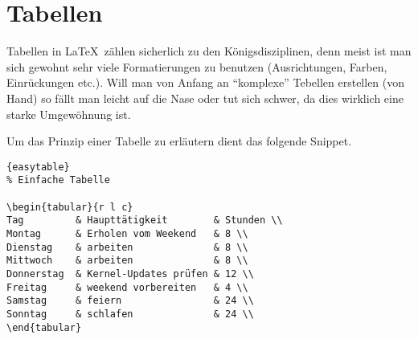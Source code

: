 \section{Tabellen}

\indent
Tabellen in \LaTeX~zählen sicherlich zu den
Königsdisziplinen, denn meist ist man sich gewohnt sehr
viele Formatierungen zu benutzen (Ausrichtungen, Farben,
Einrückungen etc.). Will man von Anfang an ``komplexe''
Tebellen erstellen (von Hand) so fällt man leicht auf die
Nase oder tut sich schwer, da dies wirklich eine starke
Umgewöhnung ist.

Um das Prinzip einer Tabelle zu erläutern dient das
folgende Snippet.

\begin{center}
\begin{lstlisting}[caption=Einfache Tabelle]{easytable}
% Einfache Tabelle

\begin{tabular}{r l c}
Tag         & Haupttätigkeit        & Stunden \\
Montag      & Erholen vom Weekend   & 8 \\
Dienstag    & arbeiten              & 8 \\
Mittwoch    & arbeiten              & 8 \\
Donnerstag  & Kernel-Updates prüfen & 12 \\
Freitag     & weekend vorbereiten   & 4 \\
Samstag     & feiern                & 24 \\
Sonntag     & schlafen              & 24 \\
\end{tabular}
\end{lstlisting}
\end{center}


